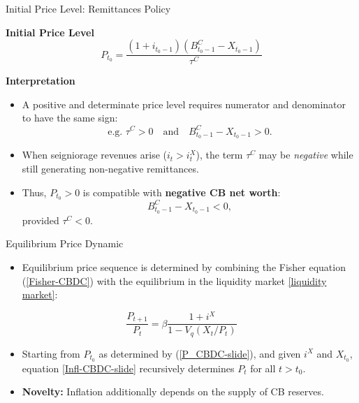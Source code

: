 \documentclass[11pt,aspectratio=169]{beamer}
\begin{document}
\begin{frame}{Initial Price Level: Remittances Policy}
\small

\textbf{Initial Price Level}
\begin{equation} \label{P_CBDC-slide}
P_{t_0} 
= \frac{(1+i_{t_0-1})(B_{t_0-1}^C - X_{t_0-1})}{\tau^C}
\end{equation}

\vspace{0.3cm}

\textbf{Interpretation}
\begin{itemize}
    \item A positive and determinate price level requires numerator and denominator to have the same sign:
    \[
      \text{e.g. } \tau^C > 0 
      \quad\text{and}\quad 
      B_{t_0-1}^C - X_{t_0-1} > 0.
    \]
    \item When seigniorage revenues arise ($i_t > i_t^X$), the term $\tau^C$ may be \emph{negative} while still generating non-negative remittances.  
    \item Thus, $P_{t_0}>0$ is compatible with \textbf{negative CB net worth}:  
    \[
      B_{t_0-1}^C - X_{t_0-1} < 0,
    \]
    provided $\tau^C<0$.
\end{itemize}

\end{frame}



\begin{frame}{Equilibrium Price Dynamic}
\begin{itemize}
    \item Equilibrium price sequence is determined by combining the Fisher equation (\ref{Fisher-CBDC}) with the equilibrium in the liquidity market \eqref{liquidity market}:
\end{itemize}
\begin{equation} \label{Infl-CBDC-slide}
\frac{P_{t+1}}{P_t} = \beta \frac{1+i^X}{1 - V_q(X_t / P_t)}
\end{equation}
\vspace{1em}
\begin{itemize}
    \item Starting from $P_{t_0}$ as determined by (\ref{P_CBDC-slide}), and given $i^X$ and $X_{t_0}$, equation \eqref{Infl-CBDC-slide} recursively determines $P_t$ for all $t > t_0$.
\vspace{1em}
    \item \textbf{Novelty:} Inflation additionally depends on the supply of CB reserves.
\end{itemize}
\end{frame}
\end{document}
